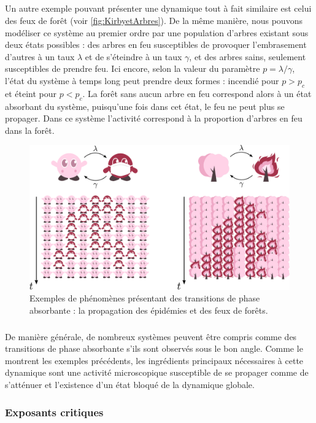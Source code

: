 \subparagraph{}Un autre exemple pouvant présenter une dynamique tout à fait similaire est celui des feux de forêt \cite{albano_spreading_1995} (voir \autoref{fig:KirbyetArbres}). De la même manière, nous pouvons modéliser ce système au premier ordre par une population d'arbres existant sous deux états possibles : des arbres en feu susceptibles de provoquer l'embrasement d'autres à un taux $\lambda$ et de s'éteindre à un taux $\gamma$, et des arbres sains, seulement susceptibles de prendre feu. Ici encore, selon la valeur du paramètre $p = \lambda/\gamma$, l'état du système à temps long peut prendre deux formes : incendié pour $p>p_c$ et éteint pour $p<p_c$. La forêt sans aucun arbre en feu correspond alors à un état absorbant du système, puisqu'une fois dans cet état, le feu ne peut plus se propager. Dans ce système l'activité correspond à la proportion d'arbres en feu dans la forêt.

\begin{figure}[h]
	\centering
	\includegraphics[width=\textwidth]{Chapitre1/Figures/TphiAbs/Kirbies.pdf}
	\caption{Exemples de phénomènes présentant des transitions de phase absorbante : la propagation des épidémies et des feux de forêts.}
	\label{fig:KirbyetArbres}
\end{figure}

\subparagraph{}De manière générale, de nombreux systèmes peuvent être compris comme des transitions de phase absorbante s'ils sont observés sous le bon angle. Comme le montrent les exemples précédents, les ingrédients principaux nécessaires à cette dynamique sont une activité microscopique susceptible de se propager comme de s'atténuer et l'existence d'un état bloqué de la dynamique globale.

\subsubsection{Exposants critiques}

